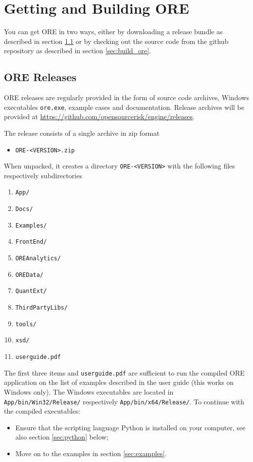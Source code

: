 \documentclass[12pt, a4paper]{article}
\begin{document}
\section{Getting and Building ORE}\label{sec:installation}

You can get ORE in two ways, either by downloading a release bundle as described in section \ref{sec:release} or by
checking out the source code from the github repository as described in section \ref{sec:build_ore}.

\subsection{ORE Releases}\label{sec:release}

ORE releases are regularly provided in the form of source code archives, Windows exe\-cutables {\tt ore.exe}, example
cases and documentation. Release archives will be provided at \url{https://github.com/opensourcerisk/engine/releases}.

\medskip
The release consists of a single archive in zip format
\begin{itemize}
\item {\tt ORE-<VERSION>.zip}
\end{itemize}

When unpacked, it creates a directory {\tt ORE-<VERSION>} with the following files respectively subdirectories
\begin{enumerate}
\item {\tt App/}
\item {\tt Docs/}
\item {\tt Examples/}
\item {\tt FrontEnd/}
\item {\tt OREAnalytics/}
\item {\tt OREData/}
\item {\tt QuantExt/}
\item {\tt ThirdPartyLibs/}
\item {\tt tools/}
\item {\tt xsd/}
\item {\tt userguide.pdf}
\end{enumerate} 

The first three items and {\tt userguide.pdf} are sufficient to run the compiled ORE application
on the list of examples described in the user guide (this works on Windows only). The Windows executables are located in {\tt App/bin/Win32/Release/} respectively {\tt App/bin/x64/Release/}. To continue with the compiled
executables:
\begin{itemize}
\item Ensure that the scripting language Python is installed on your computer, see also section \ref{sec:python}
  below;
\item Move on to the examples in section \ref{sec:examples}.
\end{itemize}
\end{document}
